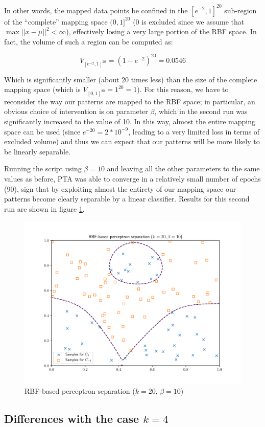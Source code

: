\documentclass[letterpaper,headings=standardclasses]{scrartcl}
\begin{document}
In other words, the mapped data points be confined in the $[e^{-2}, 1]^{20}$ sub-region of the ``complete'' mapping space $(0,1]^{20}$ (0 is excluded since we assume that $\max{||x - \mu||^2} < \infty$), effectively losing a very large portion of the RBF space. In fact, the volume of such a region can be computed as:

$$ V_{[e^{-2}, 1]^{20}} = (1 - e^{-2})^{20} = 0.0546 $$

Which is significantly smaller (about 20 times less) than the size of the complete mapping space (which is $V_{[0,1]^{20}} = 1^{20} = 1$). For this reason, we have to reconsider the way our patterns are mapped to the RBF space; in particular, an obvious choice of intervention is on parameter $\beta$, which in the second run was significantly increased to the value of 10. In this way, almost the entire mapping space can be used (since $e^{-20} = 2 * 10^{-9}$, leading to a very limited loss in terms of excluded volume) and thus we can expect that our patterns will be more likely to be linearly separable. 

Running the script using $\beta = 10$ and leaving all the other parameters to the same values as before, PTA was able to converge in a relatively small number of epochs (90), sign that by exploiting almost the entirety of our mapping space our patterns become clearly separable by a linear classifier. Results for this second run are shown in figure \ref{sep_20_10}.

\begin{figure}[h]
    \centering
    \includegraphics[width=0.7\linewidth]{sep_20_10.pdf}
    \caption{RBF-based perceptron separation ($k = 20$, $\beta = 10$)}
    \label{sep_20_10}
\end{figure}

\subsection{Differences with the case $k = 4$}
\end{document}
